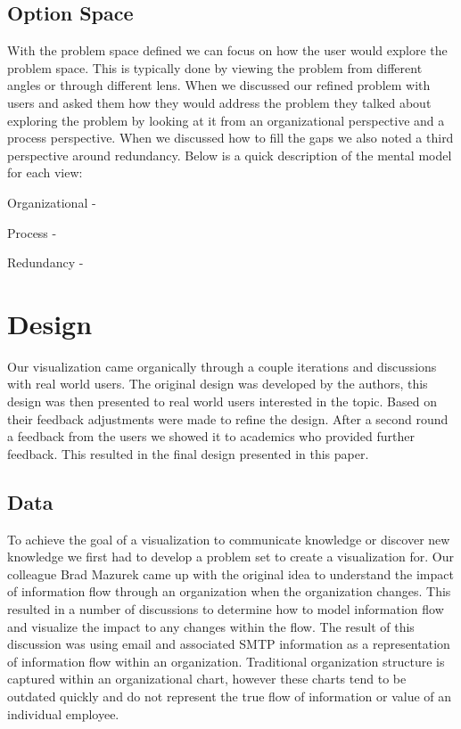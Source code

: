 \documentclass[journal]{vgtc}                %
\begin{document}
\subsection{Option Space}
With the problem space defined we can focus on how the user would explore the problem space.  This is typically done by viewing the problem from different angles or through different lens.  When we discussed our refined problem with users and asked them how they would address the problem they talked about exploring the problem by looking at it from an organizational perspective and a process perspective.  When we discussed how to fill the gaps we also noted a third perspective around redundancy.  Below is a quick description of the mental model for each view:
\item Organizational - 
\item Process - 
\item Redundancy - 

\section{Design}

Our visualization came organically through a couple iterations and discussions with real world users.  The original design was developed by the authors, this design was then presented to real world users interested in the topic.  Based on their feedback adjustments were made to refine the design.  After a second round a feedback from the users we showed it to academics who provided further feedback.  This resulted in the final design presented in this paper.

\subsection{Data}
To achieve the goal of a visualization to communicate knowledge or discover new knowledge we first had to develop a problem set to create a visualization for.  Our colleague Brad Mazurek came up with the original idea to understand the impact of information flow through an organization when the organization changes.  This resulted in a number of discussions to determine how to model information flow and visualize the impact to any changes within the flow.  The result of this discussion was using email and associated SMTP information as a representation of information flow within an organization.
Traditional organization structure is captured within an organizational chart, however these charts tend to be outdated quickly and do not represent the true flow of information or value of an individual employee.
\end{document}
